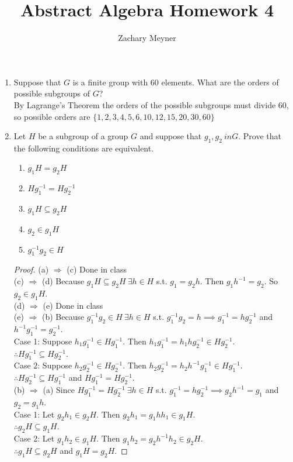 \documentclass[12pt]{article}
\title{\large Abstract Algebra Homework 4}
\author{\large Zachary Meyner}
\date{}
\newcommand\setitemnumber[1]{\setcounter{enumi}{\numexpr#1-1\relax}}
\begin{document}
\maketitle
\begin{enumerate}[label=\textbf{\arabic*}.]
	\setitemnumber{2}
	\item Suppose that $G$ is a finite group with 60 elements. What are the orders of possible subgroups of $G$? \\
	      By Lagrange's Theorem the orders of the possible subgroups must divide 60, so possible
	      orders are $\{1, 2, 3, 4, 5, 6, 10, 12, 15, 20, 30, 60\}$
	\setitemnumber{11}
	\item Let $H$ be a subgroup of a group $G$ and suppose that $g_1, g_2 \ in G$. Prove that the following 
	conditions are equivalent.
    \begin{enumerate}
        \item $g_1H = g_2H$
        \item $Hg_1^{-1} = Hg_2^{-1}$
        \item $g_1H \subseteq g_2H$
        \item $g_2 \in g_1H$
        \item $g_1^{-1}g_2 \in H$
    \end{enumerate}
    \begin{proof} (a) $\Rightarrow$ (c) Done in class \\
(c) $\Rightarrow$ (d) Because $g_1H \subseteq g_2H \ \exists h \in H$ s.t. $g_1 = g_2h$. Then $g_1h^{-1} = g_2$. So $g_2 \in g_1H$. \\
(d) $\Rightarrow$ (e) Done in class \\
(e) $\Rightarrow$ (b) Because $g_1^{-1}g_2 \in H \ \exists h \in H$ s.t. $g_1^{-1}g_2 = h \implies g_1^{-1} = hg_2^{-1}$ and $h^{-1}g_1^{-1} = g_2^{-1}$. \\
Case 1: Suppose $h_1g_1^{-1} \in Hg_1^{-1}$. Then $h_1g_1^{-1} = h_1hg_2^{-1} \in Hg_2^{-1}$. \\
$\therefore Hg_1^{-1} \subseteq Hg_2^{-1}$. \\
Case 2: Suppose $h_2g_2^{-1} \in Hg_2^{-1}$. Then $h_2g_2^{-1} = h_2h^{-1}g_1^{-1} \in Hg_1^{-1}$. \\
$\therefore Hg_2^{-1} \subseteq Hg_1^{-1}$ and $Hg_1^{-1} = Hg_2^{-1}$. \\
(b) $\Rightarrow$ (a) Since $Hg_1^{-1} = Hg_2^{-1} \ \exists h \in H$ s.t. $g_1^{-1} = hg_2^{-1} \implies g_2h^{-1} = g_1$ and $g_2 = g_1h$. \\
Case 1: Let $g_2h_1 \in g_2H$. Then $g_2h_1 = g_1hh_1 \in g_1H$. \\
$\therefore g_2H \subseteq g_1H$. \\
Case 2: Let $g_1h_2 \in g_1H$. Then $g_1h_2 = g_2h^{-1}h_2 \in g_2H$. \\
$\therefore g_1H \subseteq g_2H$ and $g_1H = g_2H$.
    \end{proof}
\end{enumerate}
\end{document}
